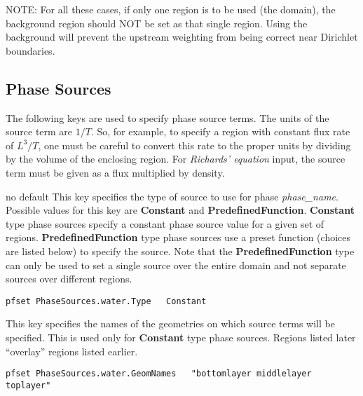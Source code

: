 NOTE: For all these cases, if only one region is to be used (the domain),
the background region should NOT be set as that single region.  
Using the background will prevent the
upstream weighting from being correct near Dirichlet boundaries.


\subsection{Phase Sources}
\label{Phase Sources}

The following keys are used to specify phase source terms.
The units of the source term are $1/T$.
So, for example, to specify a region with constant flux rate of $L^3/T$,
one must be careful to convert this rate to the proper units by
dividing by the volume of the enclosing region.
For {\em Richards' equation} input, the source term must be given as a flux
multiplied by density.

{no default}
{This key specifies the type of source to use for phase {\em phase\_name}.  
Possible values for this key are {\bf Constant} and {\bf PredefinedFunction}.
{\bf Constant} type phase sources specify a constant phase source 
value for a given set of regions.  
{\bf PredefinedFunction} type phase sources use a preset function
(choices are listed below) to specify the source.  Note that the
{\bf PredefinedFunction} type can only be used to set a single source 
over the entire domain and not separate sources over different regions.
}
\begin{display}\begin{verbatim}
pfset PhaseSources.water.Type   Constant
\end{verbatim}\end{display}


{This key specifies the names of the geometries on which source terms will be
specified.  This is used only for {\bf Constant} type phase sources.
Regions listed later ``overlay'' regions listed earlier.
}
\begin{display}\begin{verbatim}
pfset PhaseSources.water.GeomNames   "bottomlayer middlelayer toplayer"
\end{verbatim}\end{display}

